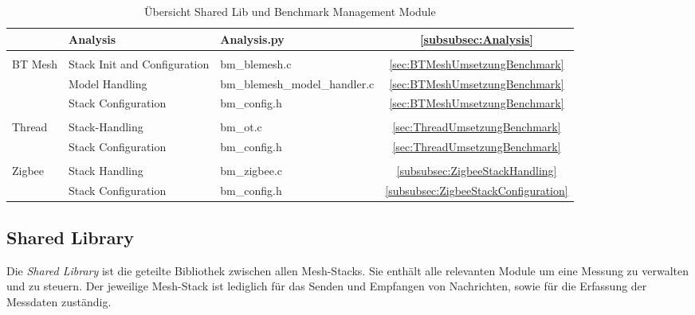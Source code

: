 \begin{table}[h]
\begin{tabular}{|l|l|l|c|}
\cline{2-4}
 & Analysis & Analysis.py & \ref{subsubsec:Analysis} \\ 
\hline
\multicolumn{1}{l}{} & \multicolumn{1}{l}{} & \multicolumn{1}{l}{} & \multicolumn{1}{l}{} \\ 
\hline
\multirow{4}{*}{BT Mesh} & Stack Init and Configuration & bm\_blemesh.c & \ref{sec:BTMeshUmsetzungBenchmark} \\ 
\cline{2-4}
& Model Handling & bm\_blemesh\_model\_handler.c & \ref{sec:BTMeshUmsetzungBenchmark} \\ 
\cline{2-4}
 & Stack Configuration & bm\_config.h & \ref{sec:BTMeshUmsetzungBenchmark} \\ 
\hline
\multicolumn{1}{l}{} & \multicolumn{1}{l}{} & \multicolumn{1}{l}{} & \multicolumn{1}{l}{} \\ 
\hline
\multirow{2}{*}{Thread} & Stack-Handling & bm\_ot.c & \ref{sec:ThreadUmsetzungBenchmark} \\ 
\cline{2-4}
 & Stack Configuration & bm\_config.h & \ref{sec:ThreadUmsetzungBenchmark} \\ 
\hline
\multicolumn{1}{l}{} & \multicolumn{1}{l}{} & \multicolumn{1}{l}{} & \multicolumn{1}{l}{} \\ 
\hline
\multirow{2}{*}{Zigbee} & Stack Handling & bm\_zigbee.c & \ref{subsubsec:ZigbeeStackHandling} \\ 
\cline{2-4}
 & Stack Configuration & bm\_config.h & \ref{subsubsec:ZigbeeStackConfiguration} \\
\hline
\end{tabular}
\caption{Übersicht Shared Lib und Benchmark Management Module}
\label{tab:UebersichtSoftware}
\end{table}



\subsection{Shared Library}\label{subsec:SharedLibrary}

Die \textit{Shared Library} ist die geteilte Bibliothek zwischen allen Mesh-Stacks. Sie enthält alle relevanten Module um eine Messung zu verwalten und zu steuern. Der jeweilige Mesh-Stack ist lediglich für das Senden und Empfangen von Nachrichten, sowie für die Erfassung der Messdaten zuständig. 


